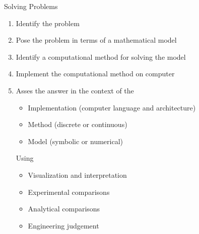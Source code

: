 \documentclass[xcolor=x11names,compress]{beamer}
\renewcommand{\(}{\begin{columns}}
\renewcommand{\)}{\end{columns}}
\newcommand{\<}[1]{\begin{column}{#1}}
\renewcommand{\>}{\end{column}}
\begin{document}
\begin{frame}{Solving Problems}
\begin{enumerate}
\item Identify the problem
\item Pose the problem in terms of a mathematical model
\item Identify a computational method for solving the model
\item Implement the computational method on computer
\item Asses the answer in the context of the
\begin{itemize}
\item Implementation (computer language and architecture)
\item Method (discrete or continuous)
\item Model (symbolic or numerical)
\end{itemize}
Using
\begin{itemize}
\item Visualization and interpretation
\item Experimental comparisons
\item Analytical comparisons
\item Engineering judgement
\end{itemize}
\end{enumerate}
\end{frame}
\end{document}
